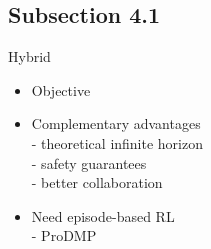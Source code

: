 \documentclass[navbaroff]{sdqbeamer}
\begin{document}
\subsection{Subsection 4.1}
\begin{frame}{}
    \centering
    \textbf{}
\end{frame}

\begin{frame}[label=hybrid]{Hybrid}
    \begin{itemize}
        \item Objective
            \pause
            \pause
            \pause
            \pause
        \item Complementary advantages\\
            - theoretical infinite horizon\\
            \pause
            - safety guarantees\\
            \pause
            - better collaboration
            \pause
        \item Need episode-based RL\\
            - ProDMP
    \end{itemize}
\end{frame}
\end{document}
